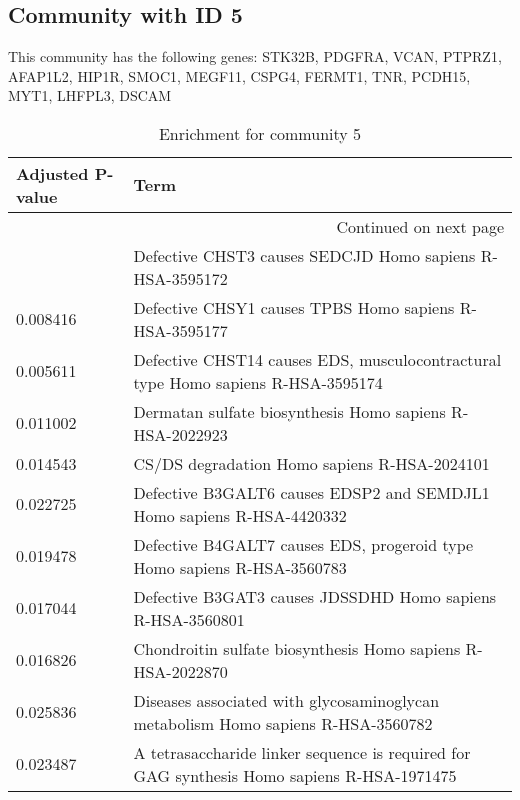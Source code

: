 \subsection*{Community with ID 5}
This community has the following genes: STK32B, PDGFRA, VCAN, PTPRZ1, AFAP1L2, HIP1R, SMOC1, MEGF11, CSPG4, FERMT1, TNR, PCDH15, MYT1, LHFPL3, DSCAM
\\
\begin{longtable}{p{2.4cm}p{14.5cm}}
\caption{Enrichment for community 5}\\
\toprule
Adjusted \newline P-value &                                                                                        Term \\
\midrule
\endhead
\midrule
\multicolumn{2}{r}{{Continued on next page}} \\
\midrule
\endfoot

\bottomrule
\endlastfoot
                 0.016832 &                                    Defective CHST3 causes SEDCJD Homo sapiens R-HSA-3595172 \\
                 0.008416 &                                      Defective CHSY1 causes TPBS Homo sapiens R-HSA-3595177 \\
                 0.005611 &            Defective CHST14 causes EDS, musculocontractural type Homo sapiens R-HSA-3595174 \\
                 0.011002 &                                    Dermatan sulfate biosynthesis Homo sapiens R-HSA-2022923 \\
                 0.014543 &                                                CS/DS degradation Homo sapiens R-HSA-2024101 \\
                 0.022725 &                       Defective B3GALT6 causes EDSP2 and SEMDJL1 Homo sapiens R-HSA-4420332 \\
                 0.019478 &                     Defective B4GALT7 causes EDS, progeroid type Homo sapiens R-HSA-3560783 \\
                 0.017044 &                                  Defective B3GAT3 causes JDSSDHD Homo sapiens R-HSA-3560801 \\
                 0.016826 &                                 Chondroitin sulfate biosynthesis Homo sapiens R-HSA-2022870 \\
                 0.025836 &            Diseases associated with glycosaminoglycan metabolism Homo sapiens R-HSA-3560782 \\
                 0.023487 &  A tetrasaccharide linker sequence is required for GAG synthesis Homo sapiens R-HSA-1971475 \\
\end{longtable}


